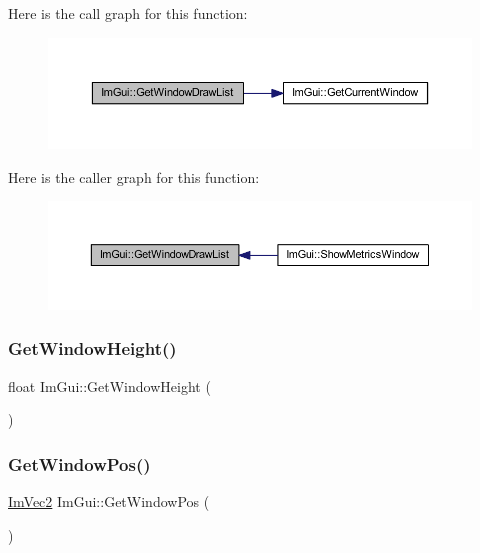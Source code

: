 Here is the call graph for this function\+:
\nopagebreak
\begin{figure}[H]
\begin{center}
\leavevmode
\includegraphics[width=350pt]{namespace_im_gui_aa100c22a9feafe843fa12c66590cbda0_cgraph}
\end{center}
\end{figure}
Here is the caller graph for this function\+:
\nopagebreak
\begin{figure}[H]
\begin{center}
\leavevmode
\includegraphics[width=350pt]{namespace_im_gui_aa100c22a9feafe843fa12c66590cbda0_icgraph}
\end{center}
\end{figure}
\mbox{\label{namespace_im_gui_a44d2bfb80e0d2dd232a553ab29a91b52}} 
\subsubsection{\texorpdfstring{Get\+Window\+Height()}{GetWindowHeight()}}
{\footnotesize\ttfamily float Im\+Gui\+::\+Get\+Window\+Height (\begin{DoxyParamCaption}{ }\end{DoxyParamCaption})}

\mbox{\label{namespace_im_gui_a413d939f3ef416a47d6e5b48be955146}} 
\subsubsection{\texorpdfstring{Get\+Window\+Pos()}{GetWindowPos()}}
{\footnotesize\ttfamily \mbox{\hyperlink{struct_im_vec2}{Im\+Vec2}} Im\+Gui\+::\+Get\+Window\+Pos (\begin{DoxyParamCaption}{ }\end{DoxyParamCaption})}


